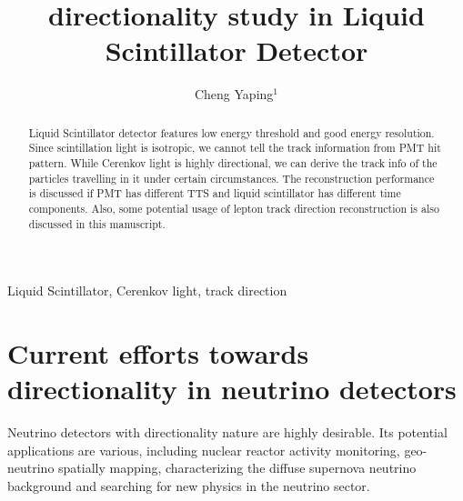 \documentclass[a4paper,10pt]{cpc-hepnp}
\begin{document}
\title{directionality study in Liquid Scintillator Detector}

\author{%
      Cheng Yaping$^{1}$%
}
\maketitle
\address{%
$^1$ Institute of High Energy Physics, Chinese
        Academy of Sciences, Beijing 100049, China\\
}


\begin{abstract}
Liquid Scintillator detector features low energy threshold
and good energy resolution. Since scintillation light is isotropic,
we cannot tell the track information from PMT hit pattern.
While Cerenkov light is highly directional, we can derive the track
info of the particles travelling in it under certain circumstances.
The reconstruction performance is discussed if PMT has different TTS and
liquid scintillator has different time components. Also, some potential
usage of lepton track direction reconstruction is also discussed in this manuscript.
\end{abstract}


\begin{keyword}
Liquid Scintillator, Cerenkov light, track direction
\end{keyword}




\section{Current efforts towards directionality in neutrino detectors}
Neutrino detectors with directionality nature are highly desirable. 
Its potential applications are various, including nuclear reactor activity monitoring,
geo-neutrino spatially mapping, characterizing the diffuse supernova neutrino background and searching
for new physics in the neutrino sector. 
\end{document}
